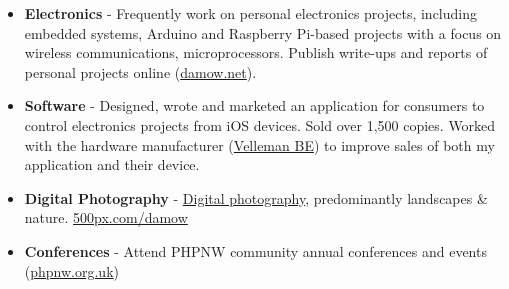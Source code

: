 \begin{itemize}

    \item \textbf{Electronics} - Frequently work on personal electronics projects, including embedded systems, Arduino and Raspberry Pi-based projects with a focus on wireless communications, microprocessors. Publish write-ups and reports of personal projects online (\href{https://damow.net}{damow.net}).
    
    \item \textbf{Software} - Designed, wrote and marketed an application for consumers to control electronics projects from iOS devices. Sold over 1,500 copies. Worked with the hardware manufacturer (\href{http://www.velleman.eu/}{Velleman BE}) to improve sales of both my application and their device.
    
    \item \textbf{Digital Photography} - \href{https://500px.com/damow}{Digital photography}, predominantly landscapes \& nature. \href{https://500px.com/damow}{500px.com/damow}
    
    \item \textbf{Conferences} - Attend PHPNW community annual conferences and events (\href{http://www.phpnw.org.uk}{phpnw.org.uk})
    
\end{itemize}
